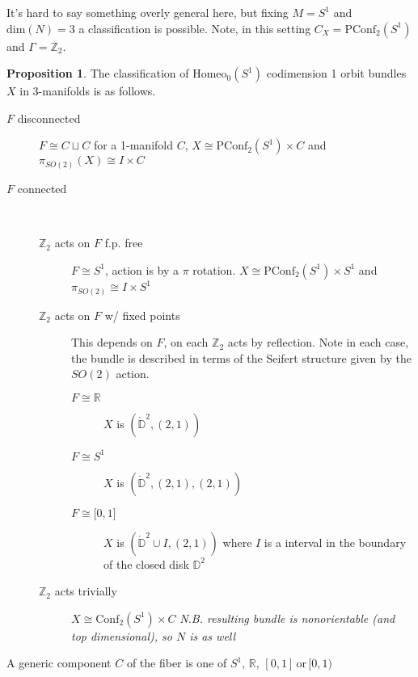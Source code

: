 \documentclass[10pt, oneside]{article}
\newcommand{\R}{\mathbb{R}}
\newcommand{\Z}{\mathbb{Z}}
\newcommand{\homeo}[1][S^1]{\text{Homeo}_0(#1)}
\newcommand{\conf}[2][S^1]{\text{Conf}_{#2}(#1)}
\newcommand{\pconf}[2][S^1]{\text{PConf}_{#2}(#1)}
\theoremstyle{definition}
\newtheorem{prop}{Proposition}[section]
\theoremstyle{definition}
\begin{document}
It's hard to say something overly general here, but fixing $M = S^1$ and $\text{dim}(N)=3$ a classification is possible. Note, in this setting $C_X = \pconf{2}$ and $\Gamma = \Z_2$.

\begin{prop}
    The classification of $\homeo$ codimension 1 orbit bundles $X$ in 3-manifolds is as follows. 
    \begin{description}
        \item[$F$ disconnected] $F\cong C\sqcup C$ for a 1-manifold $C$, $X\cong \pconf{2}\times C$ and $\pi_{SO(2)}(X) \cong I \times C$
        \item[$F$ connected] \ 
        \begin{description}
            \item[$\Z_2$ acts on $F$ f.p. free] $F\cong S^1$, action is by a $\pi$ rotation. $X\cong \pconf{2} \times S^1$ and $\pi_{SO(2)} \cong I\times S^1$
            \item[$\Z_2$ acts on $F$ w/ fixed points] This depends on $F$, on each $\Z_2$ acts by reflection. Note in each case, the bundle is described in terms of the Seifert structure given by the $SO(2)$ action.
            \begin{description}
                \item[$F\cong \R$] $X$ is $(\mathring{\mathbb{D}}^2, (2, 1))$
                \item[$F\cong S^1$] $X$ is $(\mathring{\mathbb{D}}^2, (2, 1), (2,1))$
                \item[$F \cong \lbrack 0,1\rbrack$] $X$ is $(\mathring{\mathbb{D}}^2\cup I, (2,1))$ where $I$ is a interval in the boundary of the closed disk $\mathbb{D}^2$
            \end{description}
            \item[$\Z_2$ acts trivially] $X\cong\conf{2}\times C$ {\it N.B. resulting bundle is nonorientable (and top dimensional), so $N$ is as well} 
        \end{description}
    \end{description}
    A generic component $C$ of the fiber is one of $S^1,\, \mathbb{R},\, [0,1]\, \text{or}\,  [0,1)$
\end{prop}
\end{document}
